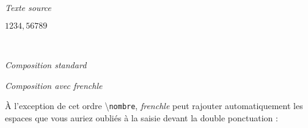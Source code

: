 \documentclass[a4paper,12pt,openright]{article}
\begin{document}
\begin{center} %
\textit{Texte source}\\[1ex]
\begin{boxedverbatim}
$1 234,567 89$
\end{boxedverbatim}
\\[.3ex]
\begin{minipage}{60mm}
\begin{center}
\textit{Composition standard}
\end{center}
\end{minipage}
\begin{minipage}{60mm}
\begin{center}
\textit{Composition avec frenchle}
\end{center}
\end{minipage}
\end{center}


À l’exception de cet ordre  \backslash\texttt{nombre}, \textit{frenchle} peut rajouter automatiquement
les espaces que vous auriez oubliés à la saisie devant la double ponctuation :
\end{document}
